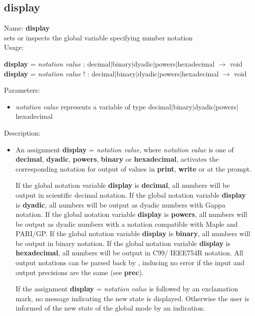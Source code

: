 \subsection{display}
\label{labdisplay}
\noindent Name: \textbf{display}\\
sets or inspects the global variable specifying number notation\\
\noindent Usage: 
\begin{center}
\textbf{display} = \emph{notation value} : \textsf{decimal$|$binary$|$dyadic$|$powers$|$hexadecimal} $\rightarrow$ \textsf{void}
\\ 
\textbf{display} = \emph{notation value} ! : \textsf{decimal$|$binary$|$dyadic$|$powers$|$hexadecimal} $\rightarrow$ \textsf{void}
\\ 
\end{center}
Parameters: 
\begin{itemize}
\item \emph{notation value} represents a variable of type \textsf{decimal$|$binary$|$dyadic$|$powers$|$hexadecimal}
\end{itemize}
\noindent Description: \begin{itemize}

\item An assignment \textbf{display} = \emph{notation value}, where \emph{notation value} is
   one of \textbf{decimal}, \textbf{dyadic}, \textbf{powers}, \textbf{binary} or \textbf{hexadecimal}, activates
   the corresponding notation for output of values in \textbf{print}, \textbf{write} or
   at the \sollya prompt.
    
   If the global notation variable \textbf{display} is \textbf{decimal}, all numbers will
   be output in scientific decimal notation.  If the global notation
   variable \textbf{display} is \textbf{dyadic}, all numbers will be output as dyadic
   numbers with Gappa notation.  If the global notation variable \textbf{display}
   is \textbf{powers}, all numbers will be output as dyadic numbers with a
   notation compatible with Maple and PARI/GP.  If the global notation
   variable \textbf{display} is \textbf{binary}, all numbers will be output in binary
   notation.  If the global notation variable \textbf{display} is \textbf{hexadecimal},
   all numbers will be output in C99/ IEEE754R notation.  All output
   notations can be parsed back by \sollya, inducing no error if the input
   and output precisions are the same (see \textbf{prec}).
    
   If the assignment \textbf{display} = \emph{notation value} is followed by an
   exclamation mark, no message indicating the new state is
   displayed. Otherwise the user is informed of the new state of the
   global mode by an indication.
\end{itemize}
